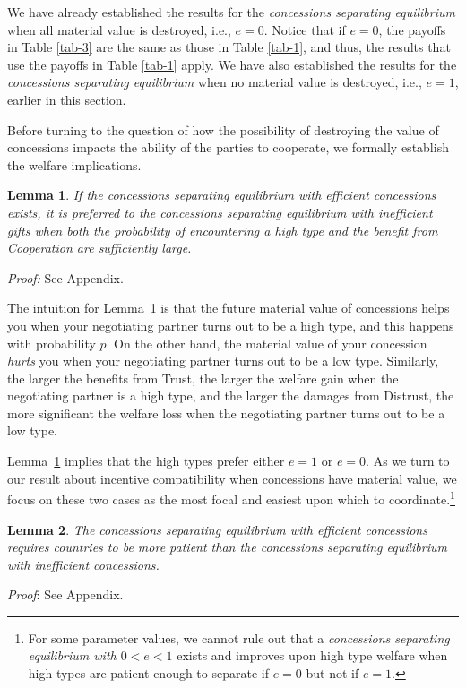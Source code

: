 \documentclass[bibtex,autowc]{apsr_submission}
\newtheorem{lemma}{Lemma}
\begin{document}
We have already established the results for the \emph{concessions separating equilibrium} when all material value is destroyed, i.e., $e=0$. Notice that if $e=0$, the payoffs in Table \ref{tab-3} are the same as those in Table \ref{tab-1}, and thus, the results that use the payoffs in Table \ref{tab-1} apply. We have also established the results for the \emph{concessions separating equilibrium} when no material value is destroyed, i.e., $e=1$, earlier in this section.

Before turning to the question of how the possibility of destroying the value of concessions impacts the ability of the parties to cooperate, we formally establish the welfare implications.

\begin{lemma}
	If the \emph{concessions separating equilibrium with efficient concessions} exists, it is preferred to the \emph{concessions separating equilibrium with inefficient gifts} when both the probability of encountering a high type and the benefit from Cooperation are sufficiently large.
	\label{lemma:efficiency}
\end{lemma}
\emph{Proof:} See Appendix.

The intuition for Lemma~\ref{lemma:efficiency} is that the future material value of concessions helps you when your negotiating partner turns out to be a high type, and this happens with probability $p$. On the other hand, the material value of your concession \emph{hurts} you when your negotiating partner turns out to be a low type. Similarly, the larger the benefits from Trust, the larger the welfare gain when the negotiating partner is a high type, and the larger the damages from Distrust, the more significant the welfare loss when the negotiating partner turns out to be a low type.

Lemma~\ref{lemma:efficiency} implies that the high types prefer either $e=1$ or $e=0$. As we turn to our result about incentive compatibility when concessions have material value, we focus on these two cases as the most focal and easiest upon which to coordinate.\footnote{For some parameter values, we cannot rule out that a \emph{concessions separating equilibrium with $0<e<1$} exists and improves upon high type welfare when high types are patient enough to separate if $e=0$ but not if $e=1$.} %

\begin{lemma}
	The \emph{concessions separating equilibrium with efficient concessions} requires countries to be more patient than the \emph{concessions separating equilibrium with inefficient concessions}. 
	\label{lemma:e-patient}
\end{lemma}
\emph{Proof}: See Appendix.
\end{document}
